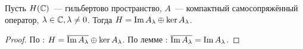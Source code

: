 \begin{theorem}[12.4 (Фредгольма)]\label{12.4}
    Пусть $H(\mathbb{C})$~--- гильбертово пространство, $A$~--- компактный самосопряжённый оператор, $\lambda \in \mathbb{C}, \lambda \neq 0$. Тогда $H = \operatorname{Im} A_\lambda \oplus \ker A_\lambda$.
\end{theorem}
\begin{proof}
    По : $H=\overline{\operatorname{Im} A_\lambda} \oplus \ker A_\lambda$. По лемме : $\overline{\operatorname{Im} A_\lambda} = \operatorname{Im} A_\lambda$.
\end{proof}